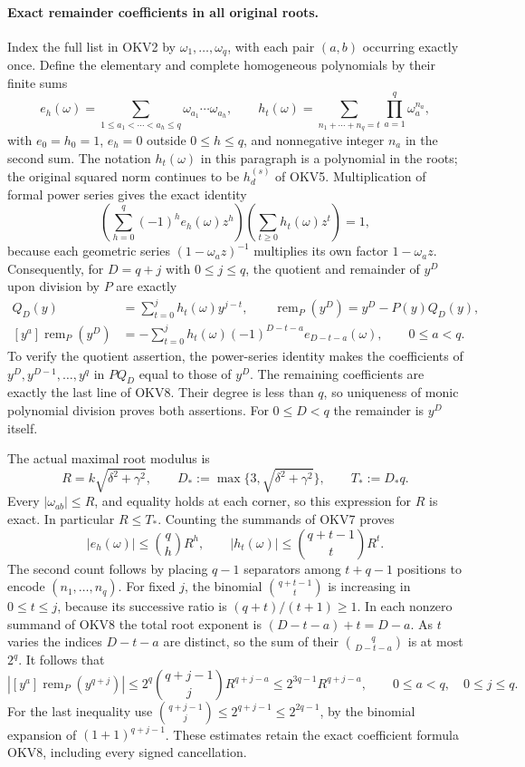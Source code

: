 \documentclass[11pt,a4paper]{article}
\begin{document}
\paragraph{Exact remainder coefficients in all original roots.}
Index the full list in OKV2 by $\omega_1,\ldots,\omega_q$, with
each pair $(a,b)$ occurring exactly once. Define the elementary and
complete homogeneous polynomials by their finite sums
\[
 e_h(\omega)=\sum_{1\le a_1<\cdots<a_h\le q}
                      \omega_{a_1}\cdots\omega_{a_h},\qquad
 h_t(\omega)=\sum_{n_1+\cdots+n_q=t}\prod_{a=1}^q\omega_a^{n_a},
 \tag{OKV7}
\]
with $e_0=h_0=1$, $e_h=0$ outside $0\le h\le q$, and
nonnegative integer $n_a$ in the second sum. The notation $h_t(\omega)$
in this paragraph is a polynomial in the roots; the original squared
norm continues to be $h_d^{(s)}$ of OKV5. Multiplication of formal
power series gives the exact identity
\[
 \left(\sum_{h=0}^q(-1)^he_h(\omega)z^h\right)
 \left(\sum_{t\ge0}h_t(\omega)z^t\right)=1,
\]
because each geometric series $(1-\omega_a z)^{-1}$ multiplies its
own factor $1-\omega_a z$. Consequently, for $D=q+j$ with $0\le j\le q$,
the quotient and remainder of $y^D$ upon division by $P$ are exactly
\[
\begin{aligned}
 Q_D(y)&=\sum_{t=0}^jh_t(\omega)y^{j-t},\qquad
 \operatorname{rem}_P(y^D)=y^D-P(y)Q_D(y),\\
 [y^a]\operatorname{rem}_P(y^D)
   &=-\sum_{t=0}^j h_t(\omega)(-1)^{D-t-a}e_{D-t-a}(\omega),
       \qquad 0\le a<q.
\end{aligned}
 \tag{OKV8}
\]
To verify the quotient assertion, the power-series identity makes
the coefficients of $y^D,y^{D-1},\ldots,y^q$ in $P Q_D$ equal
to those of $y^D$. The remaining coefficients are exactly the last
line of OKV8. Their degree is less than $q$, so uniqueness of monic
polynomial division proves both assertions. For $0\le D<q$ the
remainder is $y^D$ itself.

The actual maximal root modulus is
\[
 R=k\sqrt{\delta^2+\gamma^2},\qquad
 D_*:=\max\{3,\sqrt{\delta^2+\gamma^2}\},\qquad T_*:=D_*q.
 \tag{OKV9}
\]
Every $|\omega_{ab}|\le R$, and equality holds at each corner,
so this expression for $R$ is exact. In particular $R\le T_*$.
Counting the summands of OKV7 proves
\[
 |e_h(\omega)|\le\binom qh R^h,\qquad
 |h_t(\omega)|\le\binom{q+t-1}{t}R^t.
\]
The second count follows by placing $q-1$ separators among $t+q-1$
positions to encode $(n_1,\ldots,n_q)$. For fixed $j$, the binomial
$\binom{q+t-1}{t}$ is increasing in $0\le t\le j$, because its
successive ratio is $(q+t)/(t+1)\ge1$. In each nonzero summand
of OKV8 the total root exponent is $(D-t-a)+t=D-a$.
As $t$ varies the indices $D-t-a$ are distinct, so the sum of
their $\binom q{D-t-a}$ is at most $2^q$. It follows that
\[
 \left|[y^a]\operatorname{rem}_P(y^{q+j})\right|
 \le2^q\binom{q+j-1}{j}R^{q+j-a}
 \le2^{3q-1}R^{q+j-a},\qquad 0\le a<q,\quad0\le j\le q.
 \tag{OKV10}
\]
For the last inequality use
$\binom{q+j-1}{j}\le2^{q+j-1}\le2^{2q-1}$, by the binomial
expansion of $(1+1)^{q+j-1}$. These estimates retain the exact
coefficient formula OKV8, including every signed cancellation.
\end{document}
